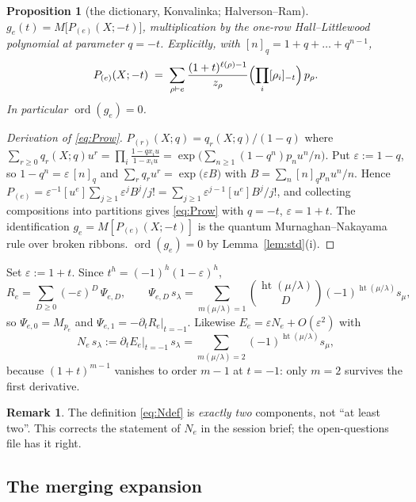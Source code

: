 \documentclass[11pt]{article}
\theoremstyle{plain}
\newtheorem{proposition}[theorem]{Proposition}
\theoremstyle{definition}
\newtheorem{remark}[theorem]{Remark}
\DeclareMathOperator{\ord}{ord}
\DeclareMathOperator{\hgt}{ht}
\newcommand{\eps}{\varepsilon}
\begin{document}
\begin{proposition}[the dictionary, Konvalinka; Halverson--Ram]\label{prop:hl}
$g_e(t)=M\bigl[P_{(e)}(X;-t)\bigr]$, multiplication by the one-row
Hall--Littlewood polynomial at parameter $q=-t$.  Explicitly, with
$[n]_{q}=1+q+\dots+q^{n-1}$,
\begin{equation}\label{eq:Prow}
  P_{(e)}(X;-t)\;=\;\sum_{\rho\vdash e}\frac{(1+t)^{\ell(\rho)-1}}{z_\rho}
  \Bigl(\prod_i [\rho_i]_{-t}\Bigr)\,p_\rho .
\end{equation}
In particular $\ord(g_e)=0$.
\end{proposition}

\begin{proof}[Derivation of \eqref{eq:Prow}]
$P_{(r)}(X;q)=q_r(X;q)/(1-q)$ where
$\sum_{r\ge0}q_r(X;q)u^r=\prod_i\frac{1-qx_iu}{1-x_iu}
=\exp\bigl(\sum_{n\ge1}(1-q^n)p_nu^n/n\bigr)$.  Put $\eps:=1-q$, so
$1-q^n=\eps\,[n]_q$ and
$\sum_r q_ru^r=\exp\bigl(\eps B\bigr)$ with $B=\sum_n [n]_q p_nu^n/n$.  Hence
$P_{(e)}=\eps^{-1}[u^e]\sum_{j\ge1}\eps^jB^j/j!
=\sum_{j\ge1}\eps^{j-1}[u^e]B^j/j!$, and collecting compositions into
partitions gives \eqref{eq:Prow} with $q=-t$, $\eps=1+t$.
The identification $g_e=M[P_{(e)}(X;-t)]$ is the quantum Murnaghan--Nakayama
rule over broken ribbons.  $\ord(g_e)=0$ by Lemma~\ref{lem:std}(i).
\end{proof}

Set $\eps:=1+t$.  Since $t^h=(-1)^h(1-\eps)^h$,
\begin{equation}\label{eq:Rexp}
  R_e=\sum_{D\ge0}(-\eps)^D\,\Psi_{e,D},
  \qquad
  \Psi_{e,D}\,s_\lambda=\sum_{m(\mu/\lambda)=1}\binom{\hgt(\mu/\lambda)}{D}
  (-1)^{\hgt(\mu/\lambda)}s_\mu ,
\end{equation}
so $\Psi_{e,0}=M_{p_e}$ and $\Psi_{e,1}=-\partial_tR_e|_{t=-1}$.  Likewise
$E_e=\eps N_e+O(\eps^2)$ with
\begin{equation}\label{eq:Ndef}
  N_e\,s_\lambda:=\partial_t E_e|_{t=-1}\,s_\lambda
   =\sum_{m(\mu/\lambda)=2}(-1)^{\hgt(\mu/\lambda)}s_\mu ,
\end{equation}
because $(1+t)^{m-1}$ vanishes to order $m-1$ at $t=-1$: only $m=2$ survives the
first derivative.

\begin{remark}
The definition \eqref{eq:Ndef} is \emph{exactly two} components, not ``at least
two''.  This corrects the statement of $N_e$ in the session brief; the
open-questions file has it right.
\end{remark}

\subsection{The merging expansion}
\end{document}
